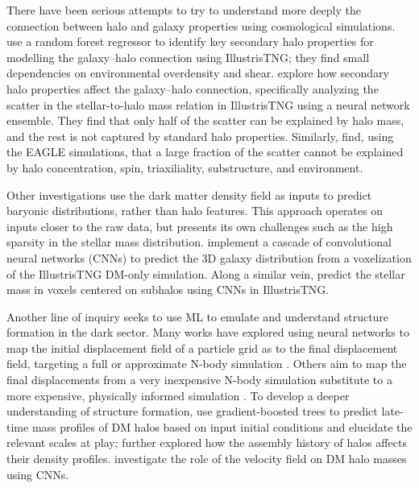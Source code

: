 There have been serious attempts to try to understand more deeply the connection between halo and galaxy properties using cosmological simulations.
\cite{delgado_modeling_2021} use a random forest regressor to identify key secondary halo properties for modelling the galaxy--halo connection using IllustrisTNG; they find small dependencies on environmental overdensity and shear.
\cite{stiskalek_scatter_2022} explore how secondary halo properties affect the galaxy--halo connection, specifically analyzing the scatter in the stellar-to-halo mass relation in IllustrisTNG using a neural network ensemble.
They find that only half of the scatter can be explained by halo mass, and the rest is not captured by standard halo properties.
Similarly, \cite{matthee_origin_2017} find, using the EAGLE simulations, that a large fraction of the scatter cannot be explained by halo concentration, spin, triaxiliality, substructure, and environment. 

Other investigations use the dark matter density field as inputs to predict baryonic distributions, rather than halo features.
This approach operates on inputs closer to the raw data, but presents its own challenges such as the high sparsity in the stellar mass distribution.
\cite{yip_dark_2019} implement a cascade of convolutional neural networks (CNNs) to predict the 3D galaxy distribution from a voxelization of the IllustrisTNG DM-only simulation.
Along a similar vein, \cite{kasmanoff_dm2gal_2020} predict the stellar mass in voxels centered on subhalos using CNNs in IllustrisTNG.

Another line of inquiry seeks to use ML to emulate and understand structure formation in the dark sector.
Many works have explored using neural networks to map the initial displacement field of a particle grid as to the final displacement field, targeting a full or approximate N-body simulation \citep{he_learning_2018,jamieson_field_2022}.
Others aim to map the final displacements from a very inexpensive N-body simulation substitute to a more expensive, physically informed simulation \citep{piras_fast_2023}. 
To develop a deeper understanding of structure formation, \cite{lucie-smith_insights_2022} use gradient-boosted trees to predict late-time mass profiles of DM halos based on input initial conditions and elucidate the relevant scales at play; \cite{lucie-smith_explaining_2023} further explored how the assembly history of halos affects their density profiles.
\cite{etezad-razavi_unravelling_2023} investigate the role of the velocity field on DM halo masses using CNNs.

